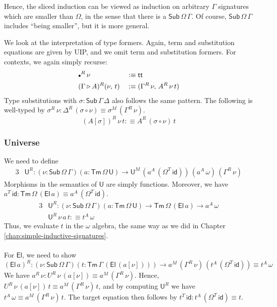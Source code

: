 \documentclass[12pt,a4paper,twoside,openany]{book}
\theoremstyle{remark}
\theoremstyle{definition}
\theoremstyle{theorem}
\newcommand{\id}{\mathsf{id}}
\newcommand{\Sub}{\mathsf{Sub}}
\newcommand{\Tm}{\mathsf{Tm}}
\newcommand{\U}{\mathsf{U}}
\newcommand{\El}{\mathsf{El}}
\renewcommand{\tt}{\mathsf{tt}}
\newcommand{\ext}{\triangleright}
\newcommand{\emptycon}{\scaleobj{.75}\bullet}
\newcommand{\defn}{:\equiv}
\begin{document}
Hence, the sliced induction can be viewed as induction on arbitrary $\Gamma$
signatures which are smaller than $\Omega$, in the sense that there is a
$\Sub\,\Omega\,\Gamma$. Of course, $\Sub\,\Omega\,\Gamma$ includes ``being
smaller'', but it is more general.

We look at the interpretation of type formers. Again, term and substitution
equations are given by UIP, and we omit term and substitution formers.  For
contexts, we again simply recurse:
\begin{alignat*}{3}
  &\emptycon^R\,\nu           &&\defn \tt\\
  &(\Gamma \ext A)^R(\nu,\,t) &&\defn (\Gamma^R\,\nu,\,A^R\,\nu\,t)
\end{alignat*}
Type substitutions with $\sigma : \Sub\,\Gamma\,\Delta$ also follows the same
pattern. The following is well-typed by $\sigma^R\,\nu :
\Delta^R\,(\sigma\circ\nu) \equiv \sigma^M\,(\Gamma^R\,\nu)$.
\[ (A[\sigma])^R\,\nu\,t \defn A^R\,(\sigma\circ\nu)\,t \]

\subsubsection{Universe}
We need to define
\begin{alignat*}{3}
  &\U^R : (\nu : \Sub\,\Omega\,\Gamma)(a : \Tm\,\Omega\,\U) \to \U^M\,(a^A\,(\Omega^T\,\id))\,(a^A\,\omega)\,(\Gamma^R\,\nu)
\end{alignat*}
Morphisms in the semantics of $\U$ are simply functions. Moreover, we have
$a^T\,\id : \Tm\,\Omega\,(\El\,a) \equiv a^A\,(\Omega^T\,\id)$.
\begin{alignat*}{3}
  &\U^R : (\nu : \Sub\,\Omega\,\Gamma)(a : \Tm\,\Omega\,\U) \to \Tm\,\Omega\,(\El\,a) \to a^A\,\omega\\
  &\U^R\,\nu\,a\,t \defn t^A\,\omega
\end{alignat*}
Thus, we evaluate $t$ in the $\omega$ algebra, the same way as we did in Chapter
\ref{chap:simple-inductive-signatures}.
\\\\
\noindent For $\El$, we need to show
\[
  (\El\,a)^R : (\nu : \Sub\,\Omega\,\Gamma)(t : \Tm\,\Gamma\,(\El\,(a[\nu]))) \to a^M\,(\Gamma^R\,\nu)\,(t^A\,(\Omega^T\,\id)) \equiv t^A\,\omega
\]
We have $a^R\,\nu : U^R\,\nu\,(a[\nu]) \equiv a^M\,(\Gamma^R\,\nu)$. Hence,
$U^R\,\nu\,(a[\nu])\,t \equiv a^M\,(\Gamma^R\,\nu)\,t$, and by computing $\U^R$
we have $t^A\,\omega \equiv a^M\,(\Gamma^R\,\nu)\,t$. The target equation then
follows by $t^T\,\id : t^A\,(\Omega^T\,\id) \equiv t$.
\end{document}
